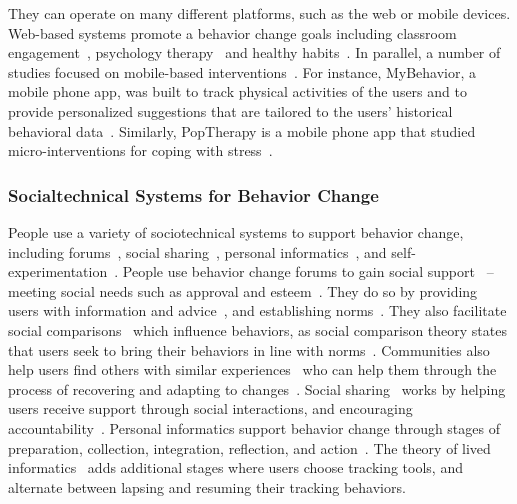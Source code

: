 They can operate on many different platforms, such as the web or mobile devices. Web-based systems promote a behavior change goals including classroom engagement~\cite{anderson2014engaging, anderson2013steering}, psychology therapy~\cite{doi:10.1080/15228830802094429} and healthy habits~\cite{cugelman2013gamification, lyons2014behavior}. In parallel, a number of studies focused on mobile-based interventions~\cite{paredes2014poptherapy, RILEY201567, FJELDSOE2009165, Whittaker09, info:doi/10.2196/mhealth.4160}. For instance, MyBehavior, a mobile phone app, was built to track physical activities of the users and to provide personalized suggestions that are tailored to the users' historical behavioral data~\cite{info:doi/10.2196/mhealth.4160}. Similarly, PopTherapy is a mobile phone app that studied micro-interventions for coping with stress~\cite{paredes2014poptherapy}.

\subsubsection{Socialtechnical Systems for Behavior Change}

People use a variety of sociotechnical systems to support behavior change, including forums~\cite{eysenbach2004health, chancellornorms}, social sharing~\cite{poirier2012social, Chung:2016:BNA:2818048.2819926, pina2017personal, Ko:2015:NGI:2675133.2675244}, personal informatics~\cite{li2010stage, Chung:2017:PTB:3025453.3025747}, and self-experimentation~\cite{Karkar:2017:TFS:3025453.3025480}. People use behavior change forums to gain social support~\cite{hong2012outcomes} -- meeting social needs such as approval and esteem~\cite{kaplan1977social}. They do so by providing users with information and advice~\cite{hong2012outcomes}, and establishing norms~\cite{chancellornorms}. They also facilitate social comparisons~\cite{davison2000talks} which influence behaviors, as social comparison theory states that users seek to bring their behaviors in line with norms~\cite{festinger1954theory}. Communities also help users find others with similar experiences~\cite{huh2014health} who can help them through the process of recovering and adapting to changes~\cite{newman2011s}. Social sharing~\cite{poirier2012social, richardson2010online} works by helping users receive support through social interactions, and encouraging accountability~\cite{epstein2015nobody}. Personal informatics support behavior change through stages of preparation, collection, integration, reflection, and action~\cite{li2010stage}. The theory of lived informatics~\cite{epstein2015lived} adds additional stages where users choose tracking tools, and alternate between lapsing and resuming their tracking behaviors. %

